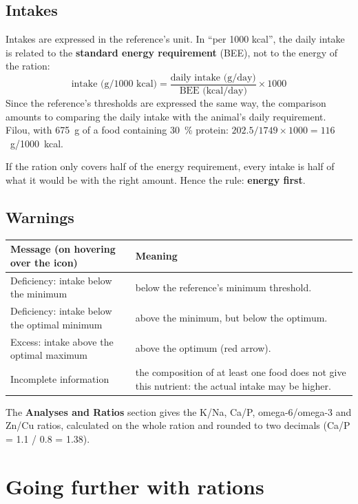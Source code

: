 \documentclass[11pt,a4paper]{article}
\newcommand{\ui}[1]{\textsf{\textbf{#1}}}
\begin{document}
\subsection{Intakes}

Intakes are expressed in the reference's unit. In ``per 1000 kcal'', the daily intake is related
to the \textbf{standard energy requirement} (BEE), not to the energy of the ration:
\[
  \text{intake (g/1000 kcal)} = \frac{\text{daily intake (g/day)}}{\text{BEE (kcal/day)}} \times 1000
\]
Since the reference's thresholds are expressed the same way, the comparison amounts to
comparing the daily intake with the animal's daily requirement. Filou, with 675~g of a food
containing 30~\% protein: $202.5 / 1749 \times 1000 = 116$~g/1000~kcal.

\begin{aretenir}
If the ration only covers half of the energy requirement, every intake is half of what it would
be with the right amount. Hence the rule: \textbf{energy first}.
\end{aretenir}

\subsection{Warnings}

\begin{tabularx}{\linewidth}{@{}>{\raggedright\arraybackslash}p{6.2cm} X@{}}
\toprule
\textbf{Message (on hovering over the icon)} & \textbf{Meaning} \\
\midrule
Deficiency: intake below the minimum & below the reference's minimum threshold. \\
Deficiency: intake below the optimal minimum & above the minimum, but below the optimum. \\
Excess: intake above the optimal maximum & above the optimum (red arrow). \\
Incomplete information & the composition of at least one food does not give this nutrient:
the actual intake may be higher. \\
\bottomrule
\end{tabularx}

The \ui{Analyses and Ratios} section gives the K/Na, Ca/P, omega-6/omega-3 and Zn/Cu ratios,
calculated on the whole ration and rounded to two decimals (Ca/P = 1.1 / 0.8 = 1.38).

\section{Going further with rations}
\end{document}
